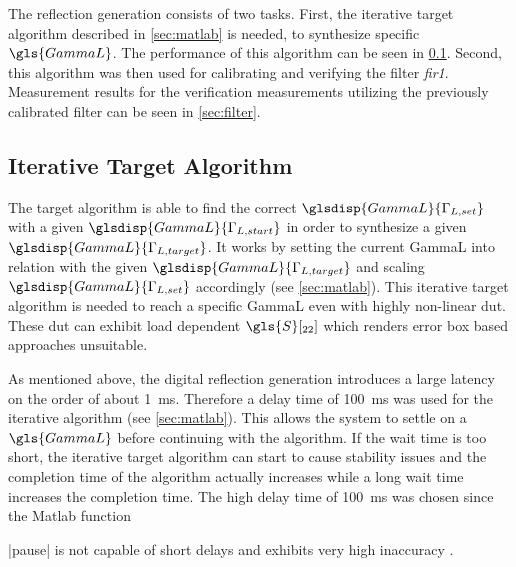 \documentclass[12pt,a4paper,parskip=full,abstract=true,BCOR=12mm]{scrreprt}
\newcommand*{\SavedLstInline}{}
\DeclareRobustCommand*{\lstinline}{%
  \ifmmode
    \let\SavedBGroup\bgroup
    \def\bgroup{%
      \let\bgroup\SavedBGroup
      \hbox\bgroup
    }%
  \fi
  \SavedLstInline
}
\def\device#1{\mbox{\textit{#1}}}
\begin{document}
The reflection generation consists of two tasks. First, the iterative target algorithm
described in \cref{sec:matlab} is needed, to synthesize specific $\gls{GammaL}$.
The performance of this algorithm can be seen in \cref{sec:iterative}. Second, this
algorithm was then used for calibrating and verifying the filter \device{fir1}. Measurement
results for the verification measurements utilizing the previously calibrated filter can be seen in \cref{sec:filter}.

\subsection{Iterative Target Algorithm}
\label{sec:iterative}

The target algorithm is able to find the correct $\glsdisp{GammaL}{\Gamma_{L,set}}$
with a given $\glsdisp{GammaL}{\Gamma_{L,start}}$ in order to synthesize a given
$\glsdisp{GammaL}{\Gamma_{L,target}}$. It works by setting the current \gls{GammaL}
into relation with the given $\glsdisp{GammaL}{\Gamma_{L,target}}$ and scaling
$\glsdisp{GammaL}{\Gamma_{L,set}}$ accordingly (see \cref{sec:matlab}). This
iterative target algorithm is needed to reach a specific \gls{GammaL} even
with highly non-linear \gls{dut}. These \gls{dut} can exhibit load dependent
$\gls{S}[_{22}]$ which renders error box based approaches unsuitable.

As mentioned above, the digital reflection generation introduces a large latency
on the order of about \SI{1}{\milli\second}. Therefore a delay time of \SI{100}{\milli\second}
was used for the iterative algorithm (see \cref{sec:matlab}). This allows the system to settle
on a $\gls{GammaL}$ before continuing with the algorithm. If the wait time is too short,
the iterative target algorithm can start to cause stability issues and the completion time of the algorithm
actually increases while a long wait time increases the completion time. The high delay
time of \SI{100}{\milli\second} was chosen since the Matlab function \lstinline|pause| is
not capable of short delays and exhibits very high inaccuracy \cite{matlab_pause}.
\end{document}
